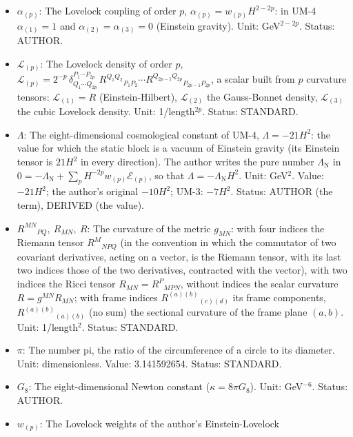 \documentclass[
  10pt,
]{article}
\begin{document}
\begin{itemize}
  with the Kronecker delta of the two labels. Status: STANDARD.
\item
  \(\alpha_{(p)}\): The Lovelock coupling of order \(p\),
  \(\alpha_{(p)} = w_{(p)}H^{2-2p}\): in UM-4 \(\alpha_{(1)} = 1\) and
  \(\alpha_{(2)} = \alpha_{(3)} = 0\) (Einstein gravity). Unit:
  GeV\(^{2-2p}\). Status: AUTHOR.
\item
  \(\mathcal{L}_{(p)}\): The Lovelock density of order \(p\),
  \(\mathcal{L}_{(p)} = 2^{-p}\,\delta^{P_1\cdots P_{2p}}_{Q_1\cdots Q_{2p}}\,R^{Q_1Q_2}{}_{P_1P_2}\cdots R^{Q_{2p-1}Q_{2p}}{}_{P_{2p-1}P_{2p}}\),
  a scalar built from \(p\) curvature tensors: \(\mathcal{L}_{(1)} = R\)
  (Einstein-Hilbert), \(\mathcal{L}_{(2)}\) the Gauss-Bonnet density,
  \(\mathcal{L}_{(3)}\) the cubic Lovelock density. Unit:
  1/length\(^{2p}\). Status: STANDARD.
\item
  \(\Lambda\): The eight-dimensional cosmological constant of UM-4,
  \(\Lambda = -21H^2\): the value for which the static block is a vacuum
  of Einstein gravity (its Einstein tensor is \(21H^2\) in every
  direction). The author writes the pure number \(\Lambda_{\mathrm{N}}\)
  in
  \(0 = -\Lambda_{\mathrm{N}} + \sum_p H^{-2p}w_{(p)}\mathcal{E}_{(p)}\),
  so that \(\Lambda = -\Lambda_{\mathrm{N}}H^2\). Unit: GeV\(^2\).
  Value: \(-21H^2\); the author's original \(-10H^2\); UM-3: \(-7H^2\).
  Status: AUTHOR (the term), DERIVED (the value).
\item
  \(R^{MN}{}_{PQ},\ R_{MN},\ R\): The curvature of the metric
  \(g_{MN}\): with four indices the Riemann tensor \(R^M{}_{NPQ}\) (in
  the convention in which the commutator of two covariant derivatives,
  acting on a vector, is the Riemann tensor, with its last two indices
  those of the two derivatives, contracted with the vector), with two
  indices the Ricci tensor \(R_{MN} = R^P{}_{MPN}\), without indices the
  scalar curvature \(R = g^{MN}R_{MN}\); with frame indices
  \(R^{(a)(b)}{}_{(c)(d)}\) its frame components,
  \(R^{(a)(b)}{}_{(a)(b)}\) (no sum) the sectional curvature of the
  frame plane \((a, b)\). Unit: 1/length\(^2\). Status: STANDARD.
\item
  \(\pi\): The number pi, the ratio of the circumference of a circle to
  its diameter. Unit: dimensionless. Value: 3.141592654. Status:
  STANDARD.
\item
  \(G_8\): The eight-dimensional Newton constant
  (\(\kappa = 8\pi G_8\)). Unit: GeV\(^{-6}\). Status: AUTHOR.
\item
  \(w_{(p)}\): The Lovelock weights of the author's Einstein-Lovelock

\end{itemize}
\end{document}
